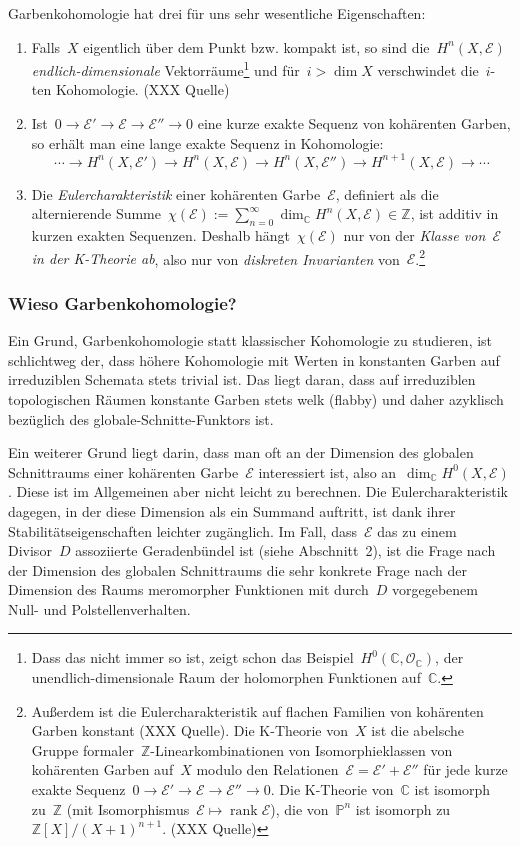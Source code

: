 \documentclass[a4paper,ngerman,12pt]{scrartcl}
\theoremstyle{definition}
\theoremstyle{plain}
\theoremstyle{remark}
\newcommand{\CC}{\mathbb{C}}
\newcommand{\ZZ}{\mathbb{Z}}
\newcommand{\PP}{\mathbb{P}}
\newcommand{\E}{\mathcal{E}}
\renewcommand{\O}{\mathcal{O}}
\newcommand{\rank}{\operatorname{rank}}
\newcommand{\lra}{\longrightarrow}
\begin{document}
Garbenkohomologie hat drei für uns sehr wesentliche Eigenschaften:
\begin{enumerate}
\item Falls~$X$ eigentlich über dem Punkt bzw. kompakt ist, so sind
die~$H^n(X,\E)$ \emph{endlich-dimensionale} Vektorräume\footnote{Dass das
nicht immer so ist, zeigt schon das Beispiel~$H^0(\CC, \O_\CC)$, der
unendlich-dimensionale Raum der holomorphen Funktionen auf~$\CC$.} und für~$i > \dim X$
verschwindet die~$i$-ten Kohomologie. (XXX Quelle)
\item Ist~$0 \to \E' \to \E \to \E'' \to 0$ eine kurze exakte Sequenz von
kohärenten Garben, so erhält man eine lange exakte Sequenz in Kohomologie:
\[ \cdots \lra H^n(X,\E') \lra H^n(X,\E) \lra H^n(X,\E'') \lra H^{n+1}(X,\E)
\lra \cdots \]
\item Die \emph{Eulercharakteristik} einer kohärenten Garbe~$\E$, definiert
als die alternierende Summe~$\chi(\E) := \sum_{n=0}^\infty \dim_\CC H^n(X,\E)
\in \ZZ$, ist additiv in kurzen exakten Sequenzen. Deshalb hängt~$\chi(\E)$ nur
von der \emph{Klasse von~$\E$ in der K-Theorie ab}, also nur von
\emph{diskreten Invarianten} von~$\E$.\footnote{Außerdem ist die
Eulercharakteristik auf flachen Familien von kohärenten Garben konstant (XXX
Quelle). Die K-Theorie von~$X$ ist die abelsche Gruppe
formaler~$\ZZ$-Linearkombinationen von Isomorphieklassen von kohärenten Garben
auf~$X$ modulo den Relationen~$\E = \E' + \E''$ für jede kurze exakte
Sequenz~$0 \to \E' \to \E \to \E'' \to 0$.  Die K-Theorie von~$\CC$ ist
isomorph zu~$\ZZ$ (mit Isomorphismus~$\E \mapsto \rank\E$), die von~$\PP^n$ ist
isomorph zu~$\ZZ[X]/(X+1)^{n+1}$. (XXX Quelle)}
\end{enumerate}


\subsubsection*{Wieso Garbenkohomologie?}

Ein Grund, Garbenkohomologie statt klassischer Kohomologie zu studieren, ist
schlichtweg der, dass höhere Kohomologie mit Werten in konstanten Garben auf
irreduziblen Schemata stets trivial ist. Das liegt daran, dass auf irreduziblen
topologischen Räumen konstante Garben stets welk (flabby) und daher azyklisch
bezüglich des globale-Schnitte-Funktors ist.

Ein weiterer Grund liegt darin, dass man oft an der Dimension des globalen
Schnittraums einer kohärenten Garbe~$\E$ interessiert ist, also an~$\dim_\CC
H^0(X,\E)$. Diese ist im Allgemeinen aber nicht leicht zu berechnen. Die
Eulercharakteristik dagegen, in der diese Dimension als ein Summand auftritt,
ist dank ihrer Stabilitätseigenschaften leichter zugänglich. Im Fall, dass~$\E$
das zu einem Divisor~$D$ assoziierte Geradenbündel ist (siehe Abschnitt~2), ist
die Frage nach der Dimension des globalen Schnittraums die sehr konkrete Frage
nach der Dimension des Raums meromorpher Funktionen mit durch~$D$ vorgegebenem
Null- und Polstellenverhalten.
\end{document}
